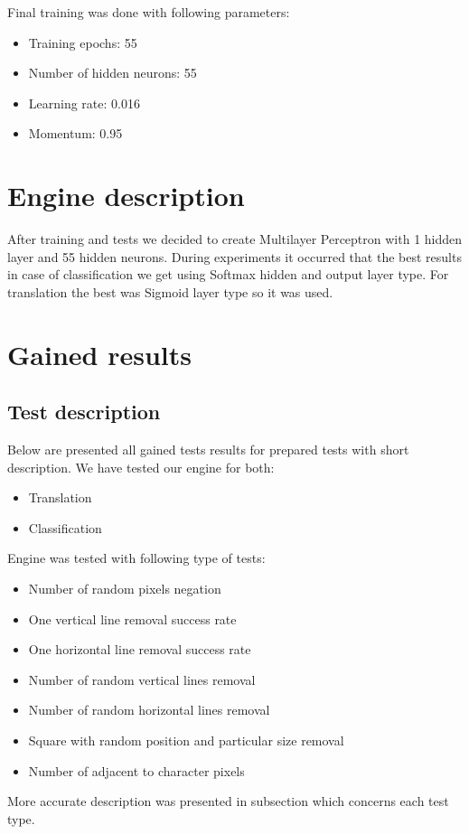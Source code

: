 \documentclass[a4paper]{article}
\begin{document}
\clearpage
Final training was done with following parameters:
\begin{itemize}
	\item Training epochs: 55
	\item Number of hidden neurons: 55
	\item Learning rate: 0.016
	\item Momentum: 0.95
\end{itemize}
\clearpage
\pagebreak
\section{Engine description}

After training and tests we decided to create Multilayer Perceptron with 1 hidden layer and 55 hidden neurons. During experiments it occurred that the best results in case of classification we get using Softmax hidden and output layer type. For translation the best was Sigmoid layer type so it was used.

\section{Gained results}
\subsection{Test description}
Below are presented all gained tests results for prepared tests with short description.
We have tested our engine for both:
\begin{itemize}
  \item Translation
  \item Classification
\end{itemize}
Engine was tested with following type of tests:
\begin{itemize}
	\item Number of random pixels negation
	\item One vertical line removal success rate 
	\item One horizontal line removal success rate
	\item Number of random vertical lines removal
	\item Number of random horizontal lines removal
	\item Square with random position and particular size removal
	\item Number of adjacent to character pixels
\end{itemize}
More accurate description was presented in subsection which concerns each test type.
\end{document}
